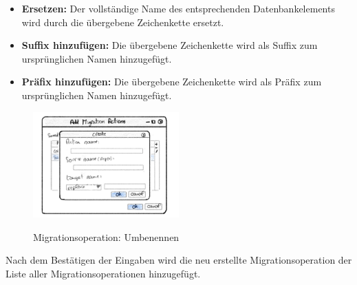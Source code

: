 \begin{itemize}
	\item \textbf{Ersetzen:} Der vollständige Name des entsprechenden Datenbankelements wird durch die übergebene Zeichenkette ersetzt.
	\item \textbf{Suffix hinzufügen:} Die übergebene Zeichenkette wird als Suffix zum ursprünglichen Namen hinzugefügt.
	\item \textbf{Präfix hinzufügen:} Die übergebene Zeichenkette wird als Präfix zum ursprünglichen Namen hinzugefügt.
\end{itemize}
\begin{figure}[H]
	\caption{Migrationsoperation: Umbenennen}
	\centering
	\includegraphics[width=0.5\textwidth]{images/add-rename-action}
	\label{img:add-rename-action}
\end{figure}
Nach dem Bestätigen der Eingaben wird die neu erstellte Migrationsoperation der Liste aller Migrationsoperationen hinzugefügt.
